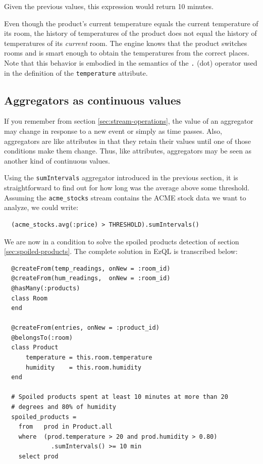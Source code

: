 \documentclass[a4,11pt]{report}
\begin{document}
Given the previous values, this expression would return 10 minutes.

Even though the product's current temperature equals the current
temperature of its room, the history of temperatures of the product
does not equal the history of temperatures of its \emph{current}
room. The engine knows that the product switches rooms and is smart
enough to obtain the temperatures from the correct places. Note that
this behavior is embodied in the semantics of the \verb=.= (dot)
operator used in the definition of the \verb=temperature= attribute.

\subsection{Aggregators as continuous values}
\label{sec:aggregators-continuous-values}

If you remember from section \ref{sec:stream-operations}, the value of
an aggregator may change in response to a new event or simply as time
passes. Also, aggregators are like attributes in that they retain
their values until one of those conditions make them change. Thus,
like attributes, aggregators may be seen as another kind of continuous
values.

Using the \verb=sumIntervals= aggregator introduced in the previous
section, it is straightforward to find out for how long was the
average above some threshold. Assuming the \verb=acme_stocks= stream
contains the ACME stock data we want to analyze, we could write:

\begin{lstlisting}
  (acme_stocks.avg(:price) > THRESHOLD).sumIntervals()
\end{lstlisting}

We are now in a condition to solve the spoiled products detection of
section \ref{sec:spoiled-products}. The complete solution in EzQL is
transcribed below:

\begin{lstlisting}
  @createFrom(temp_readings, onNew = :room_id)
  @createFrom(hum_readings,  onNew = :room_id)
  @hasMany(:products)
  class Room
  end

  @createFrom(entries, onNew = :product_id)
  @belongsTo(:room)
  class Product
      temperature = this.room.temperature
      humidity    = this.room.humidity
  end

  # Spoiled products spent at least 10 minutes at more than 20
  # degrees and 80% of humidity
  spoiled_products =
    from   prod in Product.all
    where  (prod.temperature > 20 and prod.humidity > 0.80)
             .sumIntervals() >= 10 min
    select prod
\end{lstlisting}
\end{document}
